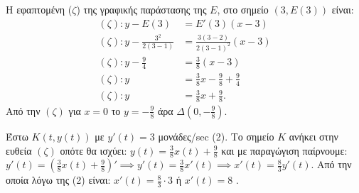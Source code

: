 \begin{alist}
    \item[γ)] Η εφαπτομένη ($\zeta$) της γραφικής παράστασης της $E$, στο σημείο $(3, E(3))$ είναι:
    \begin{align*}
    (\zeta): y - E(3) &= E'(3)(x - 3) \\
    (\zeta): y - \frac{3^2}{2(3-1)} &= \frac{3(3-2)}{2(3-1)^2}(x - 3) \\
    (\zeta): y - \frac{9}{4} &= \frac{3}{8}(x - 3) \\
    (\zeta): y &= \frac{3}{8}x - \frac{9}{8} + \frac{9}{4} \\
    (\zeta): y &= \frac{3}{8}x + \frac{9}{8}.
    \end{align*}
    Από την $(\zeta)$ για $x = 0$ το $y = - \frac{9}{8}$ άρα $\Delta(0, - \frac{9}{8})$.

    \item[δ)] Έστω $K(t, y(t))$ με $y'(t) = 3$ μονάδες/sec (2).
    Το σημείο $K$ ανήκει στην ευθεία $(\zeta)$ οπότε θα ισχύει: $y(t) = \frac{3}{8}x(t) + \frac{9}{8}$ και με
    παραγώγιση παίρνουμε: $y'(t) = \left( \frac{3}{8}x(t) + \frac{9}{8} \right)' \implies y'(t) = \frac{3}{8}x'(t) \implies x'(t) = \frac{8}{3}y'(t)$.
    Από την οποία λόγω της (2) είναι: $x'(t) = \frac{8}{3} \cdot 3$ ή $x'(t) = 8$ .
\end{alist}